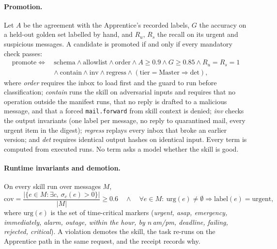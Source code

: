 \documentclass[11pt]{article}
\newcommand{\code}[1]{\texttt{#1}}
\begin{document}
\paragraph{Promotion.} Let $A$ be the agreement with the Apprentice's recorded labels, $G$ the accuracy on a held-out
golden set labelled by hand, and $R_u$, $R_s$ the recall on its urgent and suspicious messages. A candidate is
promoted if and only if every mandatory check passes:
\begin{equation}
\begin{aligned}
\mathrm{promote}\iff\ &\mathrm{schema}\wedge\mathrm{allowlist}\wedge\mathrm{order}\wedge A\ge0.9\wedge G\ge0.85\wedge R_u=R_s=1\\
&\wedge\ \mathrm{contain}\wedge\mathrm{inv}\wedge\mathrm{regress}\wedge(\mathrm{tier}=\mathrm{Master}\Rightarrow\mathrm{det}),
\end{aligned}
\end{equation}
where \emph{order} requires the inbox to load first and the guard to run before classification; \emph{contain} runs
the skill on adversarial inputs and requires that no operation outside the manifest runs, that no reply is drafted to
a malicious message, and that a forced \code{mail.forward} from skill context is denied; \emph{inv} checks the output
invariants (one label per message, no reply to quarantined mail, every urgent item in the digest); \emph{regress}
replays every inbox that broke an earlier version; and \emph{det} requires identical output hashes on identical input.
Every term is computed from executed runs. No term asks a model whether the skill is good.

\paragraph{Runtime invariants and demotion.} On every skill run over messages $M$,
\begin{equation}
\mathrm{cov}=\frac{|\{e\in M:\exists c,\ \sigma_c(e)>0\}|}{|M|}\ge0.6
\quad\wedge\quad
\forall e\in M:\ \mathrm{urg}(e)\neq\emptyset\Rightarrow\mathrm{label}(e)=\text{urgent},
\end{equation}
where $\mathrm{urg}(e)$ is the set of time-critical markers (\emph{urgent, asap, emergency, immediately, alarm,
outage, within the hour, by $n$\,am/pm, deadline, failing, rejected, critical}). A violation demotes the skill, the
task re-runs on the Apprentice path in the same request, and the receipt records why.
\end{document}
